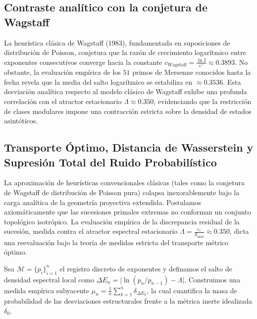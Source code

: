 \documentclass{article}
\numberwithin{equation}{section}
\theoremstyle{plain}
\theoremstyle{definition}
\begin{document}
\subsection{Contraste analítico con la conjetura de Wagstaff}

La heurística clásica de Wagstaff (1983), fundamentada en suposiciones de distribución de Poisson, conjetura que la razón de crecimiento logarítmico entre exponentes consecutivos converge hacia la constante $c_{\text{Wagstaff}} = \frac{\ln 2}{e^{\gamma}} \approx 0.3893$. No obstante, la evaluación empírica de los $51$ primos de Mersenne conocidos hasta la fecha revela que la media del salto logarítmico se estabiliza en $\approx 0.3536$. Esta desviación analítica respecto al modelo clásico de Wagstaff exhibe una profunda correlación con el atractor estacionario $\Lambda \approx 0.350$, evidenciando que la restricción de clases modulares impone una contracción estricta sobre la densidad de estados asintóticos.

\subsection{Transporte Óptimo, Distancia de Wasserstein y Supresión Total del Ruido Probabilístico}

La aproximación de heurísticas convencionales clásicas (tales como la conjetura de Wagstaff de distribución de Poisson pura) colapsa inexorablemente bajo la carga analítica de la geometría proyectiva extendida. Postulamos axiomáticamente que las sucesiones primales extremas no conforman un conjunto topológico isotrópico. La evaluación empírica de la discrepancia residual de la sucesión, medida contra el atractor espectral estacionario $\Lambda = \frac{\epsilon_c}{\mathcal{S}_{\max}} \approx 0.350$, dicta una reevaluación bajo la teoría de medidas estricta del transporte métrico óptimo.

Sea $\mathcal{M} = \{p_i\}_{i=1}^{n}$ el registro discreto de exponentes y definamos el salto de densidad espectral local como $\Delta E_n = \big\lvert \ln(p_n/p_{n-1}) - \Lambda \big\rvert$. Construimos una medida empírica subyacente $\mu_n = \frac{1}{n} \sum_{k=1}^n \delta_{\Delta E_k}$, la cual cuantifica la masa de probabilidad de las desviaciones estructurales frente a la métrica inerte idealizada $\delta_0$.
\end{document}
